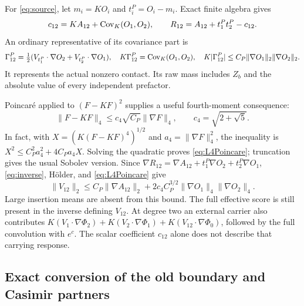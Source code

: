 \documentclass[11pt,letterpaper]{article}
\theoremstyle{plain}
\theoremstyle{remark}\newtheorem{remark}[theorem]{Scope}
\begin{document}
For \eqref{eq:source}, let $m_i=KO_i$ and $t_i^P=O_i-m_i$. Exact finite algebra gives
\begin{equation}
c_{12}=KA_{12}+\operatorname{Cov}_K(O_1,O_2),\qquad
R_{12}=A_{12}+t_1^Pt_2^P-c_{12}.
\label{eq:actualc12}
\end{equation}
An ordinary representative of its covariance part is
\begin{equation}
\Gamma_{12}^P=\tfrac12(V_{t_1^P}\cdot\nabla O_2+V_{t_2^P}\cdot\nabla O_1),
\quad K\Gamma_{12}^P=\operatorname{Cov}_K(O_1,O_2),
\quad K|\Gamma_{12}^P|\le C_P\|\nabla O_1\|_2\|\nabla O_2\|_2.
\label{eq:contactrepresentative}
\end{equation}
It represents the actual nonzero contact. Its raw mass includes $Z_b$ and the
absolute value of every independent prefactor.

Poincar\'e applied to $(F-KF)^2$ supplies a useful fourth-moment consequence:
\begin{equation}
\|F-KF\|_4\le c_4\sqrt{C_P}\|\nabla F\|_4,
\qquad c_4=\sqrt{2+\sqrt5}.
\label{eq:L4Poincare}
\end{equation}
In fact, with $X=(K(F-KF)^4)^{1/2}$ and $a_4=\|\nabla F\|_4^2$, the
inequality is $X^2\le C_P^2a_4^2+4C_Pa_4X$. Solving the quadratic proves
\eqref{eq:L4Poincare}; truncation gives the usual Sobolev version.
Since $\nabla R_{12}=\nabla A_{12}+t_1^P\nabla O_2+t_2^P\nabla O_1$,
\eqref{eq:inverse}, H\"older, and \eqref{eq:L4Poincare} give
\begin{equation}
\boxed{\|V_{12}\|_2\le C_P\|\nabla A_{12}\|_2
+2c_4C_P^{3/2}\|\nabla O_1\|_4\|\nabla O_2\|_4.}
\label{eq:V12bound}
\end{equation}
Large insertion means are absent from this bound. The full effective score is
still present in the inverse defining $V_{12}$.
At degree two an external carrier also contributes
$K(V_1\cdot\nabla\Phi_2)+K(V_2\cdot\nabla\Phi_1)
+K(V_{12}\cdot\nabla\Phi_0)$, followed by the full convolution with $e^c$.
The scalar coefficient $c_{12}$ alone does not describe that carrying response.

\subsection{Exact conversion of the old boundary and Casimir partners}
\end{document}
